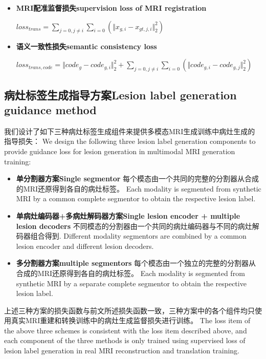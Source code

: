 \documentclass[letterpaper]{article} %
\begin{document}
\begin{itemize}
	\item \textbf{MRI配准监督损失supervision loss of MRI registration}
	\begin{center}
		$loss_{trans}=\sum\limits_{j=0,j\neq i}\sum\limits_{i=0}(\Vert{x_{g,i}-x_{gt,j,i}}\Vert_{2}^{2})$
	\end{center}
	
	\item \textbf{语义一致性损失semantic consistency loss}
	\begin{center}
		$loss_{trans,code}=\Vert{code_g-code_{g,i}}\Vert_{2}^{2}+\sum\limits_{j=0,j\neq i}\sum\limits_{i=0}(\Vert{code_{g,i}-code_{g,j}}\Vert_{2}^{2})$
	\end{center}
	
\end{itemize}

\subsection{病灶标签生成指导方案Lesion label generation guidance method}
\label{label gen methods}
我们设计了如下三种病灶标签生成组件来提供多模态MRI生成训练中病灶生成的指导损失：
We design the following three lesion label generation components to provide guidance loss for lesion generation in multimodal MRI generation training:
\begin{itemize}
	\item \textbf{单分割器方案Single segmentor} 
	每个模态由一个共同的完整的分割器从合成的MRI还原得到各自的病灶标签。
	Each modality is segmented from synthetic MRI by a common complete segmentor to obtain the respective lesion label.
	\item \textbf{单病灶编码器+多病灶解码器方案Single lesion encoder + multiple lesion decoders} 
	不同模态的分割器由一个共同的病灶编码器与不同的病灶解码器组合得到.
	Different modality segmentors are combined by a common lesion encoder and different lesion decoders. 
	\item \textbf{多分割器方案multiple segmentors} 
	每个模态由一个独立的完整的分割器从合成的MRI还原得到各自的病灶标签。
	Each modality is segmented from synthetic MRI by a separate complete segmentor to obtain the respective lesion label.
\end{itemize}
上述三种方案的损失函数与前文所述损失函数一致，三种方案中的各个组件均只使用真实MRI重建和转换训练中的病灶生成监督损失进行训练。
The loss item of the above three schemes is consistent with the loss item described above, and each component of the three methods is only trained using supervised loss of lesion label generation in real MRI reconstruction and translation training.
\end{document}

